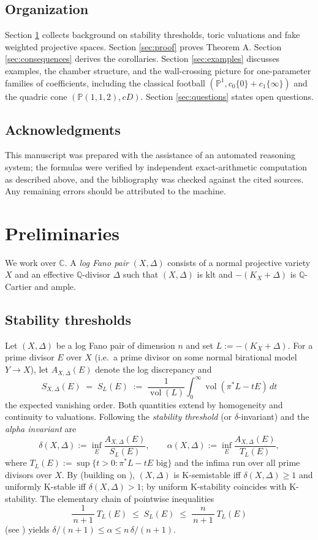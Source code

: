 \documentclass[11pt]{amsart}
\theoremstyle{definition}
\theoremstyle{remark}
\DeclareMathOperator{\Vol}{vol}
\newcommand{\Q}{\mathbb{Q}}
\newcommand{\C}{\mathbb{C}}
\newcommand{\PP}{\mathbb{P}}
\begin{document}
\subsection*{Organization} Section \ref{sec:prelim} collects background on
stability thresholds, toric valuations and fake weighted projective
spaces. Section \ref{sec:proof} proves Theorem A. Section
\ref{sec:consequences} derives the corollaries. Section \ref{sec:examples}
discusses examples, the chamber structure, and the wall-crossing picture
for one-parameter families of coefficients, including the classical
football \((\PP^1, c_0\{0\}+c_1\{\infty\})\) and the quadric cone
\((\PP(1,1,2), c D)\). Section \ref{sec:questions} states open questions.

\subsection*{Acknowledgments} This manuscript was prepared with the
assistance of an automated reasoning system; the formulas were verified by
independent exact-arithmetic computation as described above, and the
bibliography was checked against the cited sources. Any remaining errors
should be attributed to the machine.

\section{Preliminaries}\label{sec:prelim}

We work over \(\C\). A \emph{log Fano pair} \((X,\Delta)\) consists of a
normal projective variety \(X\) and an effective \(\Q\)-divisor \(\Delta\)
such that \((X,\Delta)\) is klt and \(-(K_X+\Delta)\) is \(\Q\)-Cartier
and ample.

\subsection{Stability thresholds}\label{ss:delta}
Let \((X,\Delta)\) be a log Fano pair of dimension \(n\) and set
\(L:=-(K_X+\Delta)\). For a prime divisor \(E\) over \(X\) (i.e.\ a prime
divisor on some normal birational model \(Y\to X\)), let
\(A_{X,\Delta}(E)\) denote the log discrepancy and
\[
S_{X,\Delta}(E) \;=\; S_L(E) \;:=\; \frac{1}{\Vol(L)}\int_0^{\infty}
\Vol(\pi^*L - tE)\,dt
\]
the expected vanishing order. Both quantities extend by homogeneity and
continuity to valuations. Following \cite{FO18,BJ20} the \emph{stability
threshold} (or \(\delta\)-invariant) and the \emph{alpha invariant} are
\[
\delta(X,\Delta) := \inf_{E}\frac{A_{X,\Delta}(E)}{S_L(E)},
\qquad
\alpha(X,\Delta) := \inf_{E}\frac{A_{X,\Delta}(E)}{T_L(E)},
\]
where \(T_L(E):=\sup\{t>0 : \pi^*L-tE \text{ big}\}\) and the infima run
over all prime divisors over \(X\). By \cite{FO18,BJ20} (building on
\cite{Fuj19,Li17}), \((X,\Delta)\) is K-semistable iff
\(\delta(X,\Delta)\ge1\) and uniformly K-stable iff
\(\delta(X,\Delta)>1\); by \cite{LXZ22} uniform K-stability coincides with
K-stability. The elementary chain of pointwise inequalities
\begin{equation}\label{eq:ST}
\frac{1}{\,n+1\,}\,T_L(E)\;\le\; S_L(E)\;\le\;\frac{n}{\,n+1\,}\,T_L(E)
\end{equation}
(see \cite[\S3]{BJ20}) yields
\(\delta/(n+1)\le\alpha\le n\,\delta/(n+1)\).
\end{document}
